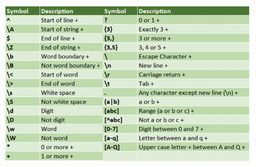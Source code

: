 \documentclass[a4paper, landscape]{article}
\begin{document}
\begin{multicols*}{4}
    \inputminted{bash}{./src.sh}
    \inputminted[obeytabs=true]{cpp}{./src.cpp}
    \inputminted[obeytabs=true]{c}{./src.c}
    \inputminted[obeytabs=true]{make}{./makefile}
    \includegraphics[width=0.8\linewidth]{./regex.png}
\end{multicols*}
\end{document}
